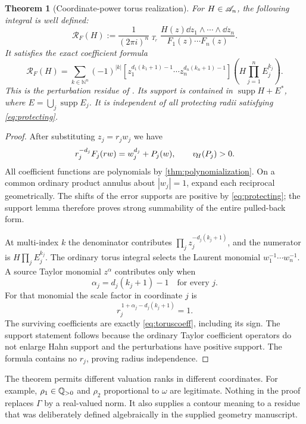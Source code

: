 \documentclass[11pt,letterpaper]{article}
\newtheorem{theorem}{Theorem}[section]
\theoremstyle{definition}
\theoremstyle{remark}
\newcommand{\N}{\mathbb N}\newcommand{\Z}{\mathbb Z}
\newcommand{\supp}{\operatorname{supp}}\newcommand{\Res}{\operatorname{Res}}
\newcommand{\HInt}{\mathop{\int^{\!H}}\nolimits}
\numberwithin{equation}{section}
\begin{document}
\begin{theorem}[Coordinate-power torus realization]\label{thm:microtorus}
For $H\in\mathscr A_n$, the following integral is well defined:
\begin{equation}\label{eq:microtorus}
 \mathcal R_F(H):=\frac1{(2\pi i)^n}
 \HInt_{T_r}\frac{H(z)\dd z_1\wedge\cdots\wedge\dd z_n}
 {F_1(z)\cdots F_n(z)}.
\end{equation}
It satisfies the exact coefficient formula
\begin{equation}\label{eq:toruscoeff}
 \boxed{\quad
 \mathcal R_F(H)=
 \sum_{k\in\N^n}(-1)^{|k|}
 [z_1^{d_1(k_1+1)-1}\cdots z_n^{d_n(k_n+1)-1}]
 \left(H\prod_{j=1}^nE_j^{k_j}\right).
 \quad}
\end{equation}
This is the perturbation residue of \cite{Geometry}. Its support is contained in $\supp H+E^*$, where $E=\bigcup_j\supp E_j$. It is independent of all protecting radii satisfying \eqref{eq:protecting}.
\end{theorem}
\begin{proof}
After substituting $z_j=r_jw_j$ we have
\[
 r_j^{-d_j}F_j(rw)=w_j^{d_j}+P_j(w),\qquad v_{\!H}(P_j)>0.
\]
All coefficient functions are polynomials by \cref{thm:polynomialization}. On a common ordinary product annulus about $|w_j|=1$, expand each reciprocal geometrically. The shifts of the error supports are positive by \eqref{eq:protecting}; the support lemma therefore proves strong summability of the entire pulled-back form.

At multi-index $k$ the denominator contributes $\prod_j z_j^{-d_j(k_j+1)}$, and the numerator is $H\prod_jE_j^{k_j}$. The ordinary torus integral selects the Laurent monomial $w_1^{-1}\cdots w_n^{-1}$. A source Taylor monomial $z^\alpha$ contributes only when
\[
 \alpha_j=d_j(k_j+1)-1\quad\text{for every }j.
\]
For that monomial the scale factor in coordinate $j$ is
\[
 r_j^{\,1+\alpha_j-d_j(k_j+1)}=1.
\]
The surviving coefficients are exactly \eqref{eq:toruscoeff}, including its sign. The support statement follows because the ordinary Taylor coefficient operators do not enlarge Hahn support and the perturbations have positive support. The formula contains no $r_j$, proving radius independence.
\end{proof}

The theorem permits different valuation ranks in different coordinates. For example, $\rho_1\in\mathbb Q_{>0}$ and $\rho_2$ proportional to $\omega$ are legitimate. Nothing in the proof replaces $\Gamma$ by a real-valued norm. It also supplies a contour meaning to a residue that was deliberately defined algebraically in the supplied geometry manuscript.
\end{document}
